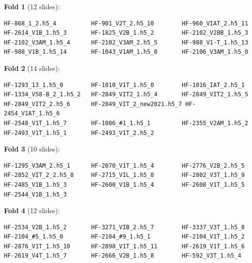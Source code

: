 \medskip
\noindent\textbf{Fold 1} (12 slides):
\begin{verbatim}
HF-868_1_2.h5_4          HF-901_V2T_2.h5_10        HF-960_VIAT_2.h5_11
HF-2614_V1B_1.h5_3       HF-1825_V2B_1.h5_2        HF-2102_V2BB_1.h5_3
HF-2102_V3AM_1.h5_4      HF-2102_V3AM_2.h5_5       HF-988_V1-T_1.h5_13
HF-988_V1B_1.h5_14       HF-1043_V1AM_1.h5_0       HF-2106_V3AM_1.h5_0
\end{verbatim}

\medskip
\noindent\textbf{Fold 2} (14 slides):
\begin{verbatim}
HF-1293_13_1.h5_0        HF-1010_V1T_1.h5_0        HF-1016_IAT_2.h5_1
HF-1334_V58-B_2_1.h5_2   HF-2849_VIT2_1.h5_4       HF-2849_VIT2_1.h5_5
HF-2849_VIT2_2.h5_6      HF-2849_VIT_2_new2021.h5_7 HF-2454_V1AT_1.h5_6
HF-2548_V1T_1.h5_7       HF-1086_#1_1.h5_1         HF-2355_V2AM_1.h5_2
HF-2493_V1T_1.h5_1       HF-2493_V1T_2.h5_2
\end{verbatim}

\medskip
\noindent\textbf{Fold 3} (10 slides):
\begin{verbatim}
HF-1295_V3AM_2.h5_1      HF-2070_V1T_1.h5_4        HF-2776_V2B_2.h5_5
HF-2852_VIT_2_2.h5_8     HF-2715_VIL_1.h5_8        HF-2802_V3T_1.h5_9
HF-2485_V1B_1.h5_3       HF-2600_V1B_1.h5_4        HF-2608_V1T_1.h5_5
HF-2544_V1B_1.h5_3
\end{verbatim}

\medskip
\noindent\textbf{Fold 4} (12 slides):
\begin{verbatim}
HF-2534_V2B_1.h5_2       HF-3271_VIB_2.h5_7        HF-3337_V3T_1.h5_8
HF-2104_#5_1.h5_0        HF-2104_#9_1.h5_1         HF-2104_V1T_1.h5_2
HF-2876_V1T_1.h5_10      HF-2898_V1T_1.h5_11       HF-2619_V1T_1.h5_6
HF-2619_V4T_1.h5_7       HF-2666_V2B_1.h5_8        HF-592_V3T_1.h5_4
\end{verbatim}
